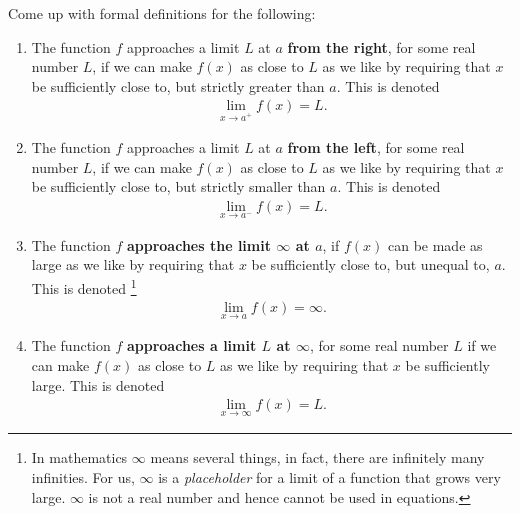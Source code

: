 \begin{exercise}
	Come up with formal definitions for the following:
	\begin{enumerate}
		\item The function $f$ approaches a limit $L$ at $a$ {\bf from the right}, for some real number $L$, if we can make $f(x)$ as close to $L$ as we like by requiring that $x$ be sufficiently close to, but strictly greater than $a$. This is denoted
		      \begin{align*}
			      \lim \limits _ {x \rightarrow a^+} f(x) = L.
		      \end{align*}
		\item The function $f$ approaches a limit $L$ at $a$ {\bf from the left}, for some real number $L$, if we can make $f(x)$ as close to $L$ as we like by requiring that $x$ be sufficiently close to, but strictly smaller than $a$. This is denoted
		      \begin{align*}
			      \lim \limits _ {x \rightarrow a^-} f(x) = L.
		      \end{align*}
		\item The function $f$ \textbf{approaches the limit $\infty$ at $a$}, if $f(x)$ can be made as large as we like by requiring that $x$ be sufficiently close to, but unequal to, $a$. This is denoted \footnote{
		In mathematics $\infty$ means several things, in fact, there are infinitely many infinities. For us, $\infty$ is a {\it placeholder} for a limit of a function that grows very large. $\infty$ is not a real number and hence cannot be used in equations.}
		      \begin{align*}
			      \lim \limits _ {x \rightarrow a} f(x) = \infty.
		      \end{align*}

		\item The function $f$ \textbf{approaches a limit $L$ at $\infty$}, for some real number $L$ if we can make $f(x)$ as close to $L$ as we like by requiring that $x$ be sufficiently large. This is denoted
		      \begin{align*}
			      \lim \limits _ {x \rightarrow \infty} f(x) = L.
		      \end{align*}
	\end{enumerate}
\end{exercise}

